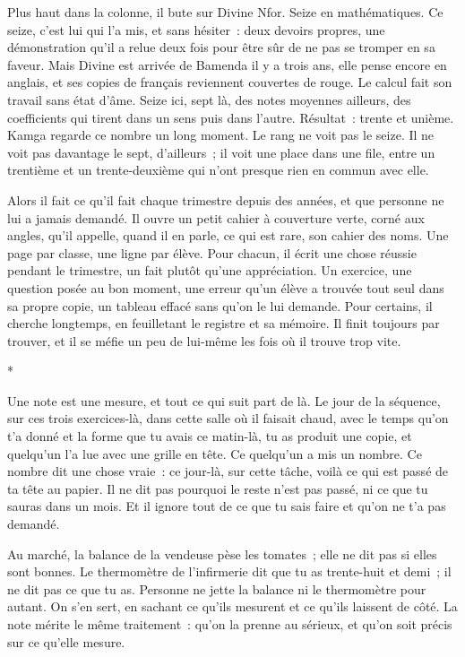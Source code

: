 \documentclass[10.5pt,twoside,openright]{book}
\newcommand{\asterisme}{\par\vspace{0.7em}\centerline{\color{gris}*\quad*\quad*}\vspace{0.7em}\par\noindent}
\begin{document}
Plus haut dans la colonne, il bute sur Divine Nfor. Seize en mathématiques. Ce seize, c’est lui qui l’a mis, et sans hésiter : deux devoirs propres, une démonstration qu’il a relue deux fois pour être sûr de ne pas se tromper en sa faveur. Mais Divine est arrivée de Bamenda il y a trois ans, elle pense encore en anglais, et ses copies de français reviennent couvertes de rouge. Le calcul fait son travail sans état d’âme. Seize ici, sept là, des notes moyennes ailleurs, des coefficients qui tirent dans un sens puis dans l’autre. Résultat : trente et unième. Kamga regarde ce nombre un long moment. Le rang ne voit pas le seize. Il ne voit pas davantage le sept, d’ailleurs ; il voit une place dans une file, entre un trentième et un trente-deuxième qui n’ont presque rien en commun avec elle.

Alors il fait ce qu’il fait chaque trimestre depuis des années, et que personne ne lui a jamais demandé. Il ouvre un petit cahier à couverture verte, corné aux angles, qu’il appelle, quand il en parle, ce qui est rare, son cahier des noms. Une page par classe, une ligne par élève. Pour chacun, il écrit une chose réussie pendant le trimestre, un fait plutôt qu’une appréciation. Un exercice, une question posée au bon moment, une erreur qu’un élève a trouvée tout seul dans sa propre copie, un tableau effacé sans qu’on le lui demande. Pour certains, il cherche longtemps, en feuilletant le registre et sa mémoire. Il finit toujours par trouver, et il se méfie un peu de lui-même les fois où il trouve trop vite.

\asterisme

Une note est une mesure, et tout ce qui suit part de là. Le jour de la séquence, sur ces trois exercices-là, dans cette salle où il faisait chaud, avec le temps qu’on t’a donné et la forme que tu avais ce matin-là, tu as produit une copie, et quelqu’un l’a lue avec une grille en tête. Ce quelqu’un a mis un nombre. Ce nombre dit une chose vraie : ce jour-là, sur cette tâche, voilà ce qui est passé de ta tête au papier. Il ne dit pas pourquoi le reste n’est pas passé, ni ce que tu sauras dans un mois. Et il ignore tout de ce que tu sais faire et qu’on ne t’a pas demandé.

Au marché, la balance de la vendeuse pèse les tomates ; elle ne dit pas si elles sont bonnes. Le thermomètre de l’infirmerie dit que tu as trente-huit et demi ; il ne dit pas ce que tu as. Personne ne jette la balance ni le thermomètre pour autant. On s’en sert, en sachant ce qu’ils mesurent et ce qu’ils laissent de côté. La note mérite le même traitement : qu’on la prenne au sérieux, et qu’on soit précis sur ce qu’elle mesure.
\end{document}

